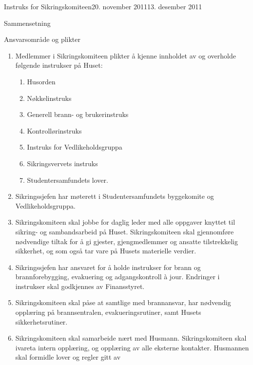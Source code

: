 \begin{instruks}{Instruks for Sikringskomiteen}{20. november 2011}{13. desember 2011}
\begin{instruksledd}{Sammensetning}
\begin{enumerate}
	
        \end{enumerate}
    \end{instruksledd}

    \begin{instruksledd}{Ansvarsområde og plikter}
        \begin{enumerate}
            \item Medlemmer i Sikringskomiteen plikter å kjenne innholdet av og overholde
                følgende instrukser på Huset:
                \begin{enumerate}
                    \item Husorden
		    \item Nøkkelinstruks
                    \item Generell brann- og brukerinstruks 
                    \item Kontrollørinstruks
                    \item Instruks for Vedlikeholdsgruppa
                    \item Sikringsvervets instruks
                    \item Studentersamfundets lover.
                \end{enumerate}
            \item Sikringssjefen har møterett i Studentersamfundets byggekomite og
                Vedlikeholdsgruppa.
            \item Sikringskomiteen skal jobbe for daglig leder med alle oppgaver knyttet
                til sikring- og sambandsarbeid på Huset.
                Sikringskomiteen skal gjennomføre nødvendige tiltak for å gi gjester,
                gjengmedlemmer og ansatte
                tilstrekkelig sikkerhet, og som også tar vare på Husets materielle
                verdier.
            \item Sikringssjefen har ansvaret for å holde instrukser for brann og
                brannforebygging, evakuering og
                adgangskontroll à jour. Endringer i instrukser skal godkjennes av
                Finansstyret.
            \item Sikringskomiteen skal påse at samtlige med brannansvar, har nødvendig
                opplæring på brannsentralen,
                evakueringsrutiner, samt Husets sikkerhetsrutiner.
            \item Sikringskomiteen skal samarbeide nært med Husmann. Sikringskomiteen skal ivareta
                intern opplæring, og opplæring av alle eksterne kontakter. Husmannen skal
                formidle lover og regler gitt av

\end{enumerate}
\end{instruksledd}
\end{instruks}
